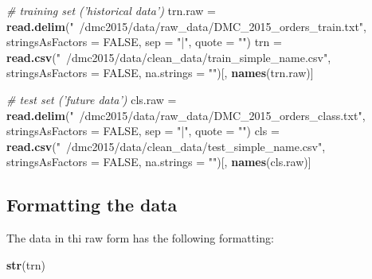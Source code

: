 \documentclass[10pt]{report}
\newenvironment{Shaded}{}{}
\newcommand{\KeywordTok}[1]{\textcolor[rgb]{0.00,0.44,0.13}{\textbf{{#1}}}}
\newcommand{\DataTypeTok}[1]{\textcolor[rgb]{0.56,0.13,0.00}{{#1}}}
\newcommand{\StringTok}[1]{\textcolor[rgb]{0.25,0.44,0.63}{{#1}}}
\newcommand{\CommentTok}[1]{\textcolor[rgb]{0.38,0.63,0.69}{\textit{{#1}}}}
\newcommand{\OtherTok}[1]{\textcolor[rgb]{0.00,0.44,0.13}{{#1}}}
\newcommand{\NormalTok}[1]{{#1}}
\begin{document}
\begin{Shaded}
\begin{Highlighting}[]
\CommentTok{# training set ('historical data')}
\NormalTok{trn.raw =}\StringTok{ }\KeywordTok{read.delim}\NormalTok{(}\StringTok{"~/dmc2015/data/raw_data/DMC_2015_orders_train.txt"}\NormalTok{, }\DataTypeTok{stringsAsFactors =} \OtherTok{FALSE}\NormalTok{, }
    \DataTypeTok{sep =} \StringTok{"|"}\NormalTok{, }\DataTypeTok{quote =} \StringTok{""}\NormalTok{)}
\NormalTok{trn =}\StringTok{ }\KeywordTok{read.csv}\NormalTok{(}\StringTok{"~/dmc2015/data/clean_data/train_simple_name.csv"}\NormalTok{, }\DataTypeTok{stringsAsFactors =} \OtherTok{FALSE}\NormalTok{, }
    \DataTypeTok{na.strings =} \StringTok{""}\NormalTok{)[, }\KeywordTok{names}\NormalTok{(trn.raw)]}

\CommentTok{# test set ('future data')}
\NormalTok{cls.raw =}\StringTok{ }\KeywordTok{read.delim}\NormalTok{(}\StringTok{"~/dmc2015/data/raw_data/DMC_2015_orders_class.txt"}\NormalTok{, }\DataTypeTok{stringsAsFactors =} \OtherTok{FALSE}\NormalTok{, }
    \DataTypeTok{sep =} \StringTok{"|"}\NormalTok{, }\DataTypeTok{quote =} \StringTok{""}\NormalTok{)}
\NormalTok{cls =}\StringTok{ }\KeywordTok{read.csv}\NormalTok{(}\StringTok{"~/dmc2015/data/clean_data/test_simple_name.csv"}\NormalTok{, }\DataTypeTok{stringsAsFactors =} \OtherTok{FALSE}\NormalTok{, }
    \DataTypeTok{na.strings =} \StringTok{""}\NormalTok{)[, }\KeywordTok{names}\NormalTok{(cls.raw)]}
\end{Highlighting}
\end{Shaded}

\subsection{Formatting the data}\label{formatting-the-data}

The data in thi raw form has the following formatting:

\begin{Shaded}
\begin{Highlighting}[]
\KeywordTok{str}\NormalTok{(trn)}
\end{Highlighting}
\end{Shaded}
\end{document}
